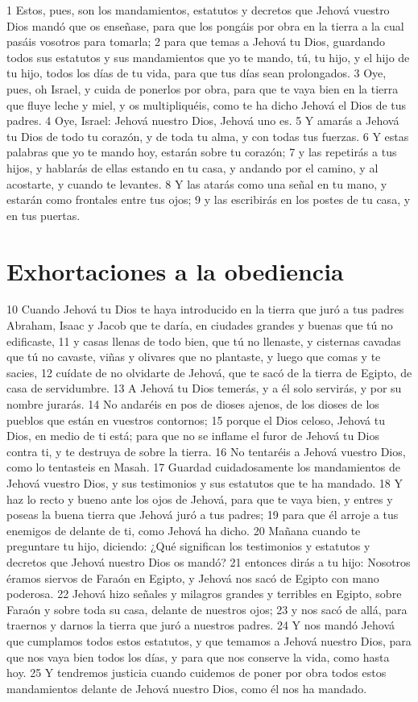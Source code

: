 1 Estos, pues, son los mandamientos, estatutos y decretos que Jehová vuestro Dios mandó que os enseñase, para que los pongáis por obra en la tierra a la cual pasáis vosotros para tomarla;
2 para que temas a Jehová tu Dios, guardando todos sus estatutos y sus mandamientos que yo te mando, tú, tu hijo, y el hijo de tu hijo, todos los días de tu vida, para que tus días sean prolongados.
3 Oye, pues, oh Israel, y cuida de ponerlos por obra, para que te vaya bien en la tierra que fluye leche y miel, y os multipliquéis, como te ha dicho Jehová el Dios de tus padres.
4 Oye, Israel: Jehová nuestro Dios, Jehová uno es.
5 Y amarás a Jehová tu Dios de todo tu corazón, y de toda tu alma, y con todas tus fuerzas.
6 Y estas palabras que yo te mando hoy, estarán sobre tu corazón;
7 y las repetirás a tus hijos, y hablarás de ellas estando en tu casa, y andando por el camino, y al acostarte, y cuando te levantes.
8 Y las atarás como una señal en tu mano, y estarán como frontales entre tus ojos;
9 y las escribirás en los postes de tu casa, y en tus puertas.

\section{Exhortaciones a la obediencia}

10 Cuando Jehová tu Dios te haya introducido en la tierra que juró a tus padres Abraham, Isaac y Jacob que te daría, en ciudades grandes y buenas que tú no edificaste,
11 y casas llenas de todo bien, que tú no llenaste, y cisternas cavadas que tú no cavaste, viñas y olivares que no plantaste, y luego que comas y te sacies,
12 cuídate de no olvidarte de Jehová, que te sacó de la tierra de Egipto, de casa de servidumbre.
13 A Jehová tu Dios temerás, y a él solo servirás, y por su nombre jurarás.
14 No andaréis en pos de dioses ajenos, de los dioses de los pueblos que están en vuestros contornos;
15 porque el Dios celoso, Jehová tu Dios, en medio de ti está; para que no se inflame el furor de Jehová tu Dios contra ti, y te destruya de sobre la tierra.
16 No tentaréis a Jehová vuestro Dios, como lo tentasteis en Masah.
17 Guardad cuidadosamente los mandamientos de Jehová vuestro Dios, y sus testimonios y sus estatutos que te ha mandado.
18 Y haz lo recto y bueno ante los ojos de Jehová, para que te vaya bien, y entres y poseas la buena tierra que Jehová juró a tus padres;
19 para que él arroje a tus enemigos de delante de ti, como Jehová ha dicho.
20 Mañana cuando te preguntare tu hijo, diciendo: ¿Qué significan los testimonios y estatutos y decretos que Jehová nuestro Dios os mandó?
21 entonces dirás a tu hijo: Nosotros éramos siervos de Faraón en Egipto, y Jehová nos sacó de Egipto con mano poderosa.
22 Jehová hizo señales y milagros grandes y terribles en Egipto, sobre Faraón y sobre toda su casa, delante de nuestros ojos;
23 y nos sacó de allá, para traernos y darnos la tierra que juró a nuestros padres.
24 Y nos mandó Jehová que cumplamos todos estos estatutos, y que temamos a Jehová nuestro Dios, para que nos vaya bien todos los días, y para que nos conserve la vida, como hasta hoy.
25 Y tendremos justicia cuando cuidemos de poner por obra todos estos mandamientos delante de Jehová nuestro Dios, como él nos ha mandado.

